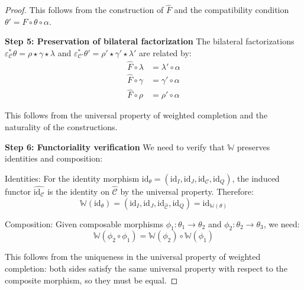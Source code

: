 \documentclass[11pt]{article}
\theoremstyle{plain}
\theoremstyle{definition}
\theoremstyle{remark}
\newcommand{\C}{\mathcal{C}}
\newcommand{\wh}[1]{\widehat{#1}}
\begin{document}
\begin{proof}
This follows from the construction of $\wh{F}$ and the compatibility condition $\theta' = F \circ \theta \circ \alpha$.

\textbf{Step 5: Preservation of bilateral factorization}
The bilateral factorizations $\varepsilon_\C^* \theta = \rho \star \gamma \star \lambda$ and $\varepsilon_{\C'}^* \theta' = \rho' \star \gamma' \star \lambda'$ are related by:
\begin{align}
\wh{F} \circ \lambda &= \lambda' \circ \alpha \\
\wh{F} \circ \gamma &= \gamma' \circ \alpha \\
\wh{F} \circ \rho &= \rho' \circ \alpha
\end{align}

This follows from the universal property of weighted completion and the naturality of the constructions.

\textbf{Step 6: Functoriality verification}
We need to verify that $\mathbb{W}$ preserves identities and composition:

Identities: For the identity morphism $\text{id}_\theta = (\text{id}_I, \text{id}_J, \text{id}_\C, \text{id}_Q)$, the induced functor $\wh{\text{id}_\C}$ is the identity on $\wh{\C}$ by the universal property. Therefore:
$$\mathbb{W}(\text{id}_\theta) = (\text{id}_I, \text{id}_J, \text{id}_{\wh{\C}}, \text{id}_Q) = \text{id}_{\mathbb{W}(\theta)}$$

Composition: Given composable morphisms $\phi_1 : \theta_1 \to \theta_2$ and $\phi_2 : \theta_2 \to \theta_3$, we need:
$$\mathbb{W}(\phi_2 \circ \phi_1) = \mathbb{W}(\phi_2) \circ \mathbb{W}(\phi_1)$$

This follows from the uniqueness in the universal property of weighted completion: both sides satisfy the same universal property with respect to the composite morphism, so they must be equal.
\end{proof}
\end{document}
